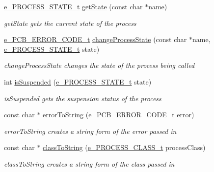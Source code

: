 \begin{DoxyCompactItemize}
\item 
\hyperlink{pcb_8h_a8461d6c03c00b03bad59b5a29d27b902}{e\+\_\+\+P\+R\+O\+C\+E\+S\+S\+\_\+\+S\+T\+A\+T\+E\+\_\+t} \hyperlink{group___r2_gae34a580c5336a0d5f2a0589f41f25fa2}{get\+State} (const char $\ast$name)
\begin{DoxyCompactList}\small\item\em get\+State gets the current state of the process \end{DoxyCompactList}\item 
\hyperlink{pcb_8h_a7e8c3ee6ff86c6b9d8fd0d2418cc2f8e}{e\+\_\+\+P\+C\+B\+\_\+\+E\+R\+R\+O\+R\+\_\+\+C\+O\+D\+E\+\_\+t} \hyperlink{group___r2_ga83a5983d76f08725aadc23bf47930436}{change\+Process\+State} (const char $\ast$name, \hyperlink{pcb_8h_a8461d6c03c00b03bad59b5a29d27b902}{e\+\_\+\+P\+R\+O\+C\+E\+S\+S\+\_\+\+S\+T\+A\+T\+E\+\_\+t} state)
\begin{DoxyCompactList}\small\item\em change\+Process\+State changes the state of the process being called \end{DoxyCompactList}\item 
int \hyperlink{group___r2_ga1e42e70128de8086a07dbcd97e000942}{is\+Suspended} (\hyperlink{pcb_8h_a8461d6c03c00b03bad59b5a29d27b902}{e\+\_\+\+P\+R\+O\+C\+E\+S\+S\+\_\+\+S\+T\+A\+T\+E\+\_\+t} state)
\begin{DoxyCompactList}\small\item\em is\+Suspended gets the suspension status of the process \end{DoxyCompactList}\item 
const char $\ast$ \hyperlink{group___r2_ga834927e89e94c123a0ec5322b11b0161}{error\+To\+String} (\hyperlink{pcb_8h_a7e8c3ee6ff86c6b9d8fd0d2418cc2f8e}{e\+\_\+\+P\+C\+B\+\_\+\+E\+R\+R\+O\+R\+\_\+\+C\+O\+D\+E\+\_\+t} error)
\begin{DoxyCompactList}\small\item\em error\+To\+String creates a string form of the error passed in \end{DoxyCompactList}\item 
const char $\ast$ \hyperlink{group___r2_gac38459f8731293f12b7fb0170c923471}{class\+To\+String} (\hyperlink{pcb_8h_ab3268ce0bdfc94e5757917d42c73d9f1}{e\+\_\+\+P\+R\+O\+C\+E\+S\+S\+\_\+\+C\+L\+A\+S\+S\+\_\+t} process\+Class)
\begin{DoxyCompactList}\small\item\em class\+To\+String creates a string form of the class passed in \end{DoxyCompactList}\item 

\end{DoxyCompactItemize}
